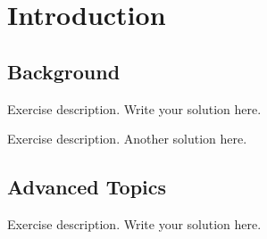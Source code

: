 \section{Introduction}

\subsection{Background}

\exercise
Exercise description.
\solution
Write your solution here.

\exercise
Exercise description.
\solution
Another solution here.

\subsection{Advanced Topics}

\exercise
Exercise description.
\solution
Write your solution here.
